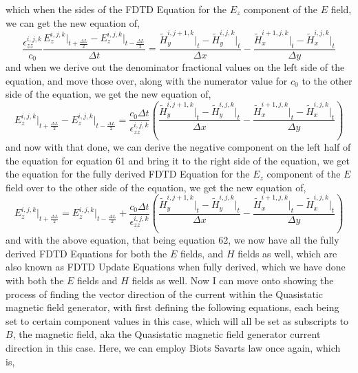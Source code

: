 \documentclass[]{article}
\begin{document}
which when the sides of the FDTD Equation for the $E_z$ component of the $E$ field, we can get the new equation of,
\begin{equation}
\frac{\epsilon_{zz}^{i,j,k}}{c_0} \frac{{E}_{z}^{i,j,k}\Big|_{t+\frac{\Delta{L}}{2}} -E_{z}^{i,j,k}\Big|_{t - \frac{\Delta{L}}{2}}}{\Delta{t}} = \frac{\tilde{H}_{y}^{i, j + 1 , k} \Big|_t - \tilde{H}_{y}^{i,j,k}\Big|_t}{\Delta{x}} - \frac{\tilde{H}_{x}^{i + 1, j, k} \Big|_t - \tilde{H}_{x}^{i,j,k}\Big|_t}{\Delta{y}}
\end{equation}
and when we derive out the denominator fractional values on the left side of the equation, and move those over, along with the numerator value for $c_0$ to the other side of the equation, we get the new equation of,
\begin{equation}
{E}_{z}^{i,j,k}\Big|_{t+\frac{\Delta{L}}{2}} -E_{z}^{i,j,k}\Big|_{t - \frac{\Delta{L}}{2}} = \frac{c_0\Delta{t}}{\epsilon_{zz}^{i,j,k}} \left(\frac{\tilde{H}_{y}^{i, j + 1 , k} \Big|_t - \tilde{H}_{y}^{i,j,k}\Big|_t}{\Delta{x}} - \frac{\tilde{H}_{x}^{i + 1, j, k} \Big|_t - \tilde{H}_{x}^{i,j,k}\Big|_t}{\Delta{y}}\right)
\end{equation}
and now with that done, we can derive the negative component on the left half of the equation for equation 61 and bring it to the right side of the equation, we get the equation for the fully derived FDTD Equation for the $E_z$ component of the $E$ field over to the other side of the equation, we get the new equation of,
\begin{equation}
{E}_{z}^{i,j,k}\Big|_{t+\frac{\Delta{L}}{2}} = E_{z}^{i,j,k}\Big|_{t - \frac{\Delta{L}}{2}} + \frac{c_0\Delta{t}}{\epsilon_{zz}^{i,j,k}} \left(\frac{\tilde{H}_{y}^{i, j + 1 , k} \Big|_t - \tilde{H}_{y}^{i,j,k}\Big|_t}{\Delta{x}} - \frac{\tilde{H}_{x}^{i + 1, j, k} \Big|_t - \tilde{H}_{x}^{i,j,k}\Big|_t}{\Delta{y}}\right)
\end{equation}
and with the above equation, that being equation 62, we now have all the fully derived FDTD Equations for both the $E$ fields, and $H$ fields as well, which are also known as FDTD Update Equations when fully derived, which we have done with both the $E$ fields and $H$ fields as well. Now I can move onto showing the process of finding the vector direction of the current within the Quasistatic magnetic field generator, with first defining the following equations, each being set to certain component values in this case, which will all be set as subscripts to $B$, the magnetic field, aka the Quasistatic magnetic field generator current direction in this case. Here, we can employ Biots Savarts law once again, which is,
\end{document}
